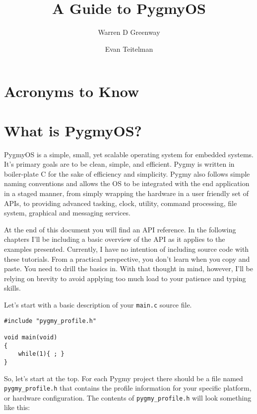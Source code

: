 \documentclass{article}
\begin{document}
\title{A Guide to PygmyOS}
\author{Warren D Greenway \and Evan Teitelman}
\maketitle

\tableofcontents

\section{Acronyms to Know}
\begin{acronym}
\end{acronym}

\section{What is PygmyOS?}
PygmyOS is a simple, small, yet scalable operating system for embedded systems. It's primary goals are to be clean, simple, and efficient. Pygmy is written in boiler-plate C for the sake of efficiency and simplicity. Pygmy also follows simple naming conventions and allows the OS to be integrated with the end application in a staged manner, from simply wrapping the hardware in a user friendly set of APIs, to providing advanced tasking, clock, utility, command processing, file system, graphical and messaging services.

At the end of this document you will find an API reference. In the following chapters I'll be including a basic overview of the API as it applies to the examples presented. Currently, I have no intention of including source code with these tutorials. From a practical perspective, you don't learn when you copy and paste. You need to drill the basics in. With that thought in mind, however, I'll be relying on brevity to avoid applying too much load to your patience and typing skills.

Let's start with a basic description of your \verb|main.c| source file.

\begin{lstlisting}
#include "pygmy_profile.h"

void main(void)
{
	while(1){ ; }
}
\end{lstlisting}

So, let's start at the top. For each Pygmy project there should be a file named \verb|pygmy_profile.h| that contains the profile information for your specific platform, or hardware configuration. The contents of \verb|pygmy_profile.h| will look something like this:
\end{document}
